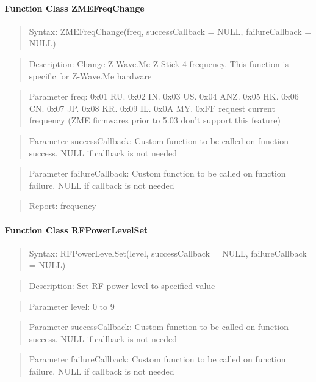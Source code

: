 \paragraph{Function Class ZMEFreqChange}
\begin{quote}Syntax: ZMEFreqChange(freq, successCallback = NULL, failureCallback = NULL)\end{quote}
\begin{quote}Description: Change Z-Wave.Me Z-Stick 4 frequency. This function is specific for Z-Wave.Me hardware\end{quote}
\begin{quote}Parameter freq: 0x01 RU. 0x02 IN. 0x03 US. 0x04 ANZ. 0x05 HK. 0x06 CN. 0x07 JP. 0x08 KR. 0x09 IL. 0x0A MY. 0xFF request current frequency (ZME firmwares prior to 5.03 don't support this feature)\end{quote}
\begin{quote}Parameter successCallback: Custom function to be called on function success. NULL if callback is not needed\end{quote}
\begin{quote}Parameter failureCallback: Custom function to be called on function failure. NULL if callback is not needed\end{quote}
\begin{quote}Report: frequency\end{quote}

\paragraph{Function Class RFPowerLevelSet}
\begin{quote}Syntax: RFPowerLevelSet(level, successCallback = NULL, failureCallback = NULL)\end{quote}
\begin{quote}Description: Set RF power level to specified value\end{quote}
\begin{quote}Parameter level: 0 to 9\end{quote}
\begin{quote}Parameter successCallback: Custom function to be called on function success. NULL if callback is not needed\end{quote}
\begin{quote}Parameter failureCallback: Custom function to be called on function failure. NULL if callback is not needed\end{quote}


